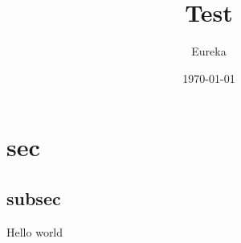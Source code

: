 \documentclass{beamer}
\title{Test}
\author{Eureka}
\date{\today}
\begin{document}
\section{sec}
\subsection{subsec}
\begin{frame}
  Hello world
\end{frame} 
\end{document}
